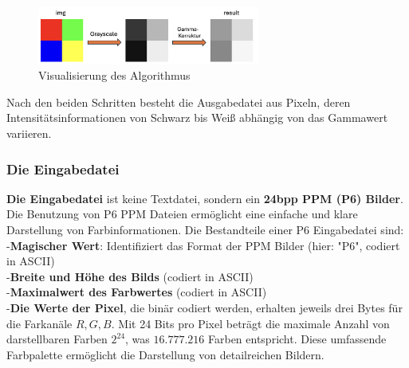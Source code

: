 \documentclass[course=erap]{aspdoc}
\begin{document}
\begin{figure}[ht]
\centering
\includegraphics[width =0.65\textwidth]{explanation.png}
\caption{Visualisierung des Algorithmus}
\label{fig:2}
\end{figure}

Nach den beiden Schritten besteht die Ausgabedatei aus Pixeln, deren Intensitätsinformationen von Schwarz bis Weiß abhängig von das Gammawert variieren. 
\subsubsection{Die Eingabedatei}
\textbf{Die Eingabedatei} ist keine Textdatei, sondern ein \textbf{24bpp PPM (P6) Bilder}\cite{P6Files}. Die Benutzung von P6 PPM Dateien ermöglicht eine einfache und klare Darstellung von Farbinformationen. Die Bestandteile einer P6 Eingabedatei sind:\\
-\textbf{Magischer Wert}: Identifiziert das Format der PPM Bilder (hier: "P6", codiert in ASCII)\\
-\textbf{Breite und Höhe des Bilds} (codiert in ASCII)\\
-\textbf{Maximalwert des Farbwertes} (codiert in ASCII) \\
-\textbf{Die Werte der Pixel}, die binär codiert werden, erhalten jeweils drei Bytes für die Farkanäle $R, G, B$. Mit 24 Bits pro Pixel beträgt die maximale Anzahl von darstellbaren Farben $2^{24}$, was $16.777.216$ Farben entspricht. Diese umfassende Farbpalette ermöglicht die Darstellung von detailreichen Bildern.

\end{document}
